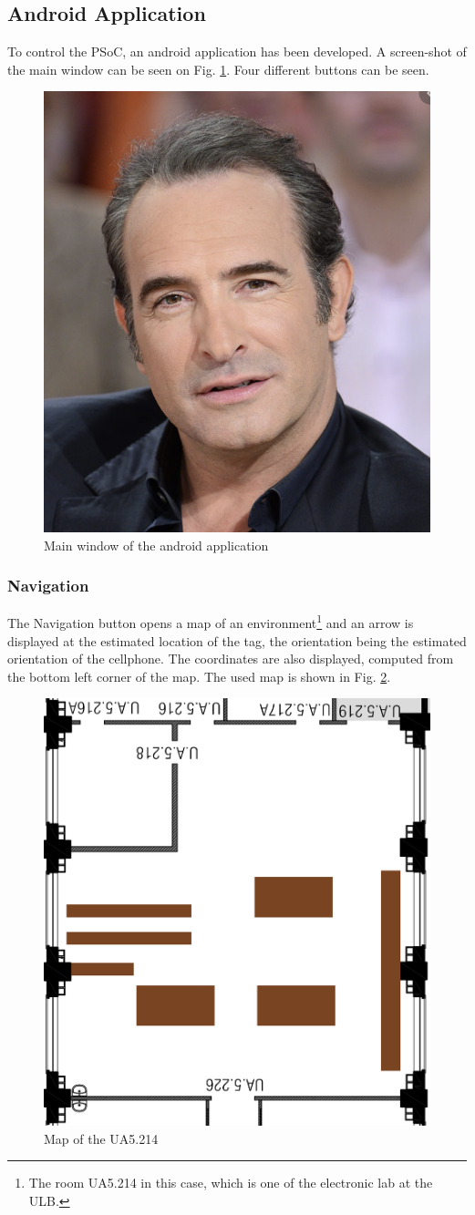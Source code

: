 \subsection{Android Application}

To control the PSoC, an android application has been developed. A screen-shot of the main window can be seen on Fig. \ref{fig:android_app}. Four different buttons can be seen.

\begin{figure}[H]
	\centering
	\includegraphics[width=.2\linewidth]{Images/Temporary_pic.png}
	\caption{Main window of the android application}
	\label{fig:android_app}
\end{figure}

\subsubsection{Navigation}

The Navigation button opens a map of an environment\footnote{The room UA5.214 in this case, which is one of the electronic lab at the ULB.} and an arrow is displayed at the estimated location of the tag, the orientation being the estimated orientation of the cellphone. The coordinates are also displayed, computed from the bottom left corner of the map. The used map is shown in Fig. \ref{fig:ua5_map}.

\begin{figure}[H]
	\centering
	\includegraphics[width=.4\linewidth]{Images/little_room.png}
	\caption{Map of the UA5.214}
	\label{fig:ua5_map}
\end{figure}


